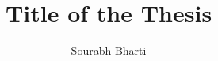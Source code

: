 \documentclass[defaultstyle,11pt]{thesis}
\title{Title of the Thesis}
\author{Sourabh Bharti}
\begin{document}








\nocite{*}		%

\appendix


\end{document}
